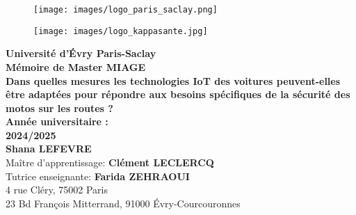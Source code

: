 \documentclass{article}
\begin{document}
\begin{titlepage}
    \begin{center}
        
        \begin{figure}[h]
            \centering
            \begin{minipage}[c]{0.45\textwidth}
                \centering
                \texttt{[image: images/logo\_paris\_saclay.png]}
            \end{minipage}
            \hfill
            \begin{minipage}[c]{0.45\textwidth}
                \centering
                \texttt{[image: images/logo\_kappasante.jpg]}
            \end{minipage}
        \end{figure}
   

        {\Large \textbf{Université d'Évry Paris-Saclay}}\\[0.5cm]
        {\Large \textbf{Mémoire de Master MIAGE}}\\[2cm]

        {\huge \textbf{Dans quelles mesures les technologies IoT des voitures peuvent-elles être adaptées pour répondre aux besoins spécifiques de la sécurité des motos sur les routes ? }}\\[1cm]
        {\Large\textbf{Année universitaire :}} \\[0.5cm]
        {\Large \textbf{2024/2025}}\\[1cm]
        {\Large \textbf{Shana LEFEVRE}}\\[2cm]
        {\Large Maître d'apprentissage: \textbf{Clément LECLERCQ}}\\[0.5cm]
        {\Large Tutrice enseignante: \textbf{Farida ZEHRAOUI}}\\[3cm]
        {\Large{4 rue Cléry, 75002 Paris}} \\
        {\Large{23 Bd François Mitterrand, 91000 Évry-Courcouronnes}} \\[0.5cm]
    \end{center}
\end{titlepage}


\tableofcontents %

\newpage

\newpage

\newpage

\newpage

\newpage

\newpage
\printbibliography
{}
\end{document}
